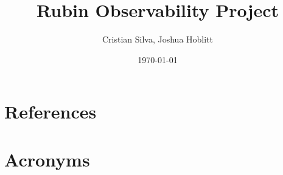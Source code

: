 \documentclass[PMO,authoryear,lsstdraft,toc]{lsstdoc}
\title{Rubin Observability Project}
\author{%
Cristian Silva, Joshua Hoblitt
}
\date{\today}
\begin{document}
\maketitle




\appendix
\section{References} \label{sec:bib}
\renewcommand{\refname}{} %


\section{Acronyms} \label{sec:acronyms}

\end{document}
